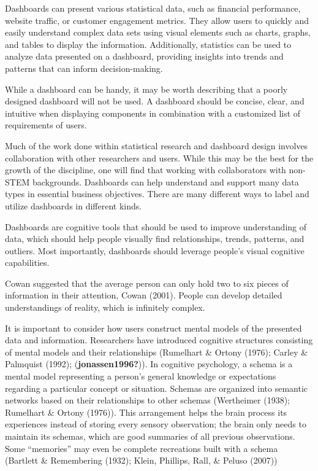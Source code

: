 \documentclass[print]{nuthesis}
\begin{document}
Dashboards can present various statistical data, such as financial performance, website traffic, or customer engagement metrics.
They allow users to quickly and easily understand complex data sets using visual elements such as charts, graphs, and tables to display the information.
Additionally, statistics can be used to analyze data presented on a dashboard, providing insights into trends and patterns that can inform decision-making.

While a dashboard can be handy, it may be worth describing that a poorly designed dashboard will not be used.
A dashboard should be concise, clear, and intuitive when displaying components in combination with a customized list of requirements of users.

Much of the work done within statistical research and dashboard design involves collaboration with other researchers and users.
While this may be the best for the growth of the discipline, one will find that working with collaborators with non-STEM backgrounds.
Dashboards can help understand and support many data types in essential business objectives.
There are many different ways to label and utilize dashboards in different kinds.

Dashboards are cognitive tools that should be used to improve understanding of data, which should help people visually find relationships, trends, patterns, and outliers.
Most importantly, dashboards should leverage people's visual cognitive capabilities.

Cowan suggested that the average person can only hold two to six pieces of information in their attention, Cowan (2001).
People can develop detailed understandings of reality, which is infinitely complex.

It is important to consider how users construct mental models of the presented data and information.
Researchers have introduced cognitive structures consisting of mental models and their relationships (Rumelhart \& Ortony (1976); Carley \& Palmquist (1992); (\textbf{jonassen1996?})).
In cognitive psychology, a schema is a mental model representing a person's general knowledge or expectations regarding a particular concept or situation.
Schemas are organized into semantic networks based on their relationships to other schemas (Wertheimer (1938); Rumelhart \& Ortony (1976)).
This arrangement helps the brain process its experiences instead of storing every sensory observation; the brain only needs to maintain its schemas, which are good summaries of all previous observations.
Some ``memories'' may even be complete recreations built with a schema (Bartlett \& Remembering (1932); Klein, Phillips, Rall, \& Peluso (2007))
\end{document}

